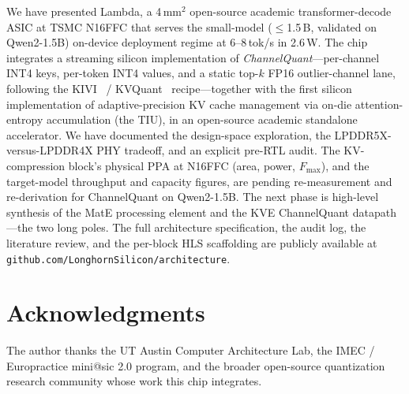 \documentclass[conference]{IEEEtran}
\begin{document}
We have presented Lambda, a 4\,mm$^2$ open-source academic transformer-decode ASIC at TSMC N16FFC that serves the small-model ($\leq$1.5\,B, validated on Qwen2-1.5B) on-device deployment regime at 6--8\,tok/s in 2.6\,W. The chip integrates a streaming silicon implementation of \emph{ChannelQuant}---per-channel INT4 keys, per-token INT4 values, and a static top-$k$ FP16 outlier-channel lane, following the KIVI~\cite{kivi} / KVQuant~\cite{kvquant} recipe---together with the first silicon implementation of adaptive-precision KV cache management via on-die attention-entropy accumulation (the TIU), in an open-source academic standalone accelerator. We have documented the design-space exploration, the LPDDR5X-versus-LPDDR4X PHY tradeoff, and an explicit pre-RTL audit. The KV-compression block's physical PPA at N16FFC (area, power, $F_\mathrm{max}$), and the target-model throughput and capacity figures, are pending re-measurement and re-derivation for ChannelQuant on Qwen2-1.5B. The next phase is high-level synthesis of the MatE processing element and the KVE ChannelQuant datapath---the two long poles. The full architecture specification, the audit log, the literature review, and the per-block HLS scaffolding are publicly available at \texttt{github.com/LonghornSilicon/architecture}.

\section*{Acknowledgments}

The author thanks the UT Austin Computer Architecture Lab, the IMEC / Europractice mini@sic 2.0 program, and the broader open-source quantization research community whose work this chip integrates.



\end{document}
